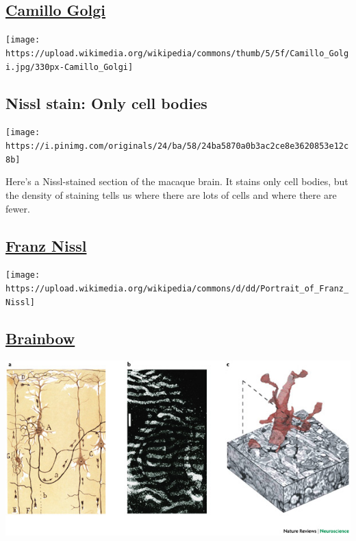 \documentclass[]{article}
\begin{document}
\hypertarget{camillo-golgi}{%
\subsection{\texorpdfstring{\href{https://en.wikipedia.org/wiki/Camillo_Golgi}{Camillo
Golgi}}{Camillo Golgi}}\label{camillo-golgi}}

\begin{center}\texttt{[image: https://upload.wikimedia.org/wikipedia/commons/thumb/5/5f/Camillo\_Golgi.jpg/330px-Camillo\_Golgi]} \end{center}

\hypertarget{nissl-stain-only-cell-bodies}{%
\subsection{\texorpdfstring{\textbf{Nissl stain}: Only cell
bodies}{Nissl stain: Only cell bodies}}\label{nissl-stain-only-cell-bodies}}

\begin{center}\texttt{[image: https://i.pinimg.com/originals/24/ba/58/24ba5870a0b3ac2ce8e3620853e12c8b]} \end{center}

Here's a Nissl-stained section of the macaque brain. It stains only cell
bodies, but the density of staining tells us where there are lots of
cells and where there are fewer.

\hypertarget{franz-nissl}{%
\subsection{\texorpdfstring{\href{https://en.wikipedia.org/wiki/Franz_Nissl}{Franz
Nissl}}{Franz Nissl}}\label{franz-nissl}}

\begin{center}\texttt{[image: https://upload.wikimedia.org/wikipedia/commons/d/dd/Portrait\_of\_Franz\_Nissl]} \end{center}

\hypertarget{brainbow}{%
\subsection{\texorpdfstring{\href{http://cbs.fas.harvard.edu/science/connectome-project/brainbow}{Brainbow}}{Brainbow}}\label{brainbow}}

\begin{center}\includegraphics[width=700px]{img/lichtman-nrn2391-f1} \end{center}
\end{document}
